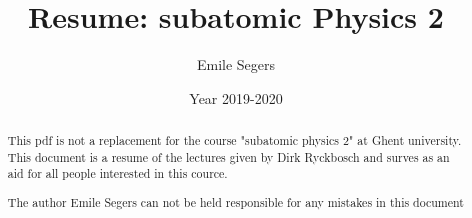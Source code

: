 \documentclass{article}
\title{Resume: subatomic Physics 2}
\author{Emile Segers}
\date{Year 2019-2020}
\begin{document}
\maketitle

\begin{abstract}
    This pdf is not a replacement for the course "subatomic physics 2" at Ghent university. This document is a resume of the lectures given by Dirk Ryckbosch and surves as an aid for all people interested in this cource.
    
    The author Emile Segers can not be held responsible for any mistakes in this document
\end{abstract}


\end{document}
